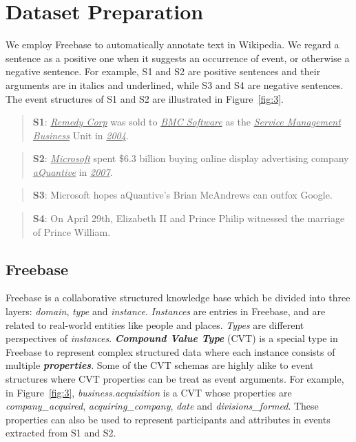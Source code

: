 \section{Dataset Preparation}
We employ Freebase to automatically annotate text in Wikipedia. We regard a sentence as a positive one when it suggests an occurrence of event, or otherwise a negative sentence. For example, S1 and S2 are positive sentences and their arguments are in italics and underlined, while S3 and S4 are negative sentences. The event structures of S1 and S2 are illustrated in Figure~\ref{fig:3}.

\begin{quote}
	\textbf{S1}: \underline{\emph{Remedy Corp}} was sold to \underline{\emph{BMC Software}} as the \underline{\emph{Service Management Business}} Unit in \underline{\emph{2004}}.
\end{quote}
\begin{quote}
	\textbf{S2}: \underline{\emph{Microsoft}} spent \$6.3 billion buying online display advertising company \underline{\emph{aQuantive}} in \underline{\emph{2007}}.
\end{quote}
\begin{quote}
	\textbf{S3}: Microsoft hopes aQuantive's Brian McAndrews can outfox Google.
\end{quote}
\begin{quote}
	\textbf{S4}: On April 29th, Elizabeth II and Prince Philip witnessed the marriage of Prince William.
\end{quote}

\subsection{Freebase}
Freebase\cite{bollacker2008freebase} is a collaborative structured knowledge base which be divided into three layers: \emph{domain}, \emph{type} and \emph{instance}. \emph{Instances} are entries in Freebase, and are related to real-world entities like people and places. \emph{Types} are different perspectives of \emph{instances}. \textbf{\emph{Compound Value Type}} (CVT) is a special type in Freebase to represent complex structured data where each instance consists of multiple \textbf{\emph{properties}}. Some of the CVT schemas are highly alike to event structures where CVT properties can be treat as event arguments. For example, in Figure~\ref{fig:3}, \emph{business.acquisition} is a CVT whose properties are \emph{company\_acquired}, \emph{acquiring\_company}, \emph{date} and \emph{divisions\_formed}. These properties can also be used to represent participants and attributes in events extracted from S1 and S2.

